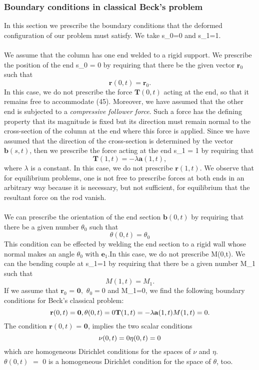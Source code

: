 
\subsubsection{Boundary conditions in classical Beck's problem}
In this section we prescribe the boundary conditions that the deformed configuration of our problem must satisfy. We take s_0=0 and s_1=1.\\\\
We assume that the column has one end welded to a rigid support. We prescribe the position of the end s_0 = 0 by requiring that there be the given vector $\mathbf{r}_0$ such that
\[ \mathbf{r}(0,t) = \mathbf{r}_0.\]
In this case, we do not prescribe the force $\mathbf{T}(0,t)$ acting at the end, so that it remains free to accommodate (45). Moreover, we have assumed that the other end is subjected to a \emph{compressive follower force}. Such a force has the defining property that its magnitude is fixed but its direction must remain normal to the cross-section of the column at the end where this force is applied. Since we have assumed that the direction of the cross-section is determined by the vector $\mathbf{b}(s,t)$, then we prescribe the force acting at the end s_1 = 1 by requiring that 
\[ \mathbf{T}(1,t) = -\lambda \mathbf{a}(1,t), \]
where $\lambda$ is a constant. In this case, we do not prescribe $\mathbf{r}(1,t).$ We observe that for equilibrium problems, one is not free to prescribe forces at both ends in an arbitrary way because it is necessary, but not sufficient, for equilibrium that the resultant force on the rod vanish.
\\\\
We can prescribe the orientation of the end section $\mathbf{b}(0,t)$ by requiring that there be a given number $\theta_0$ such that
\[
\theta(0,t)=\theta_0
\]
This condition can be effected by welding the end section to a rigid wall whose normal makes an angle $\theta_0$ with $\mathbf{e}_1$.In this case, we do not prescribe M(0,t).
We can the bending couple at s_1=1 by requiring that there be a given number M_1 such that
\[ M(1,t) = M_1.\]
If we assume that $\mathbf{r}_0$ = $\mathbf{0},$ $\theta_0=0$ and M_1=0, we find the following boundary conditions for Beck's classical problem:
\[ 
\mathbf{r}(0,t) = \mathbf{0},\\
\theta(0,t) = 0\\
\mathbf{T}(1,t) = -\lambda \mathbf{a}(1,t)\\
M(1,t) = 0.
\]
The condition $\mathbf{r}(0,t)$ = $\mathbf{0}$, implies the two scalar conditions
\[
\nu(0,t)= 0\\
\eta(0,t)= 0
\]
which are homogeneous Dirichlet conditions for the spaces of $\nu$ and $\eta$. $\theta(0,t)\,\,=\,\,0$ is a homogeneous Dirichlet condition for the space of $\theta$, too.
